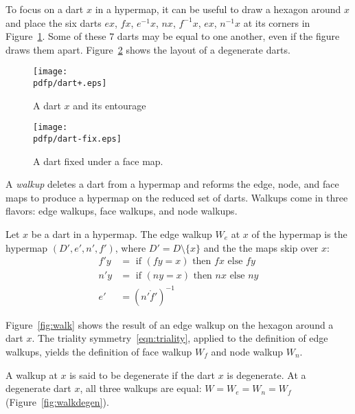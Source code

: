 To focus on a dart $x$ in a
hypermap, it can be useful to draw a hexagon around $x$ and place
the six darts $e x$,
$f x$, $e^{-1} x$, $n x$,  $f^{-1} x$, $e x$, $n^{-1} x$  at its corners
in Figure~\ref{fig:dart+}.  Some of these $7$ darts may be
equal to one another, even if the figure draws them apart.
Figure~\ref{fig:dart-fix} shows the layout of a degenerate darts.

\begin{figure}[htb]
  \centering
  \texttt{[image: \\pdfp/dart+.eps]}
  \caption{A dart $x$ and its entourage}
  \label{fig:dart+}
\end{figure}

\begin{figure}[htb]
  \centering
  \texttt{[image: \\pdfp/dart-fix.eps]}
  \caption{A dart fixed under a face map.}
  \label{fig:dart-fix}
\end{figure}


A {\it walkup} deletes
a dart from a hypermap and reforms the edge, node, and face
maps to produce a hypermap on the reduced set of darts.  Walkups
come in three flavors: edge walkups, face walkups,
and node walkups.

\begin{definition}[walkup]
Let $x$ be a dart in a hypermap.  The edge walkup 
$W_e$ at $x$ of the hypermap is the hypermap
$(D',e',n',f')$, where $D' = D\setminus\{x\}$ and the
the maps skip over $x$:
    $$
    \begin{array}{lll}
    f' y &= \text{ if } (f y =  x) \text{ then } f x \text{ else
    } f y\\
    n' y &= \text{ if } (n y = x) \text{ then } n x \text{ else
    } n y\\
    e' &= (n'\ocirc f')^{-1}
    \end{array}
    $$
\end{definition}

Figure~\ref{fig:walk} shows
the result of an edge walkup on the hexagon around a dart $x$.
The triality symmetry~\ref{eqn:triality}, applied to the definition
of edge walkups, yields the definition of
face walkup $W_f$ and node walkup $W_n$.  

A walkup at $x$ is said to be degenerate if the dart $x$ is degenerate.   At a degenerate dart $x$, all three walkups are equal: $W=W_e=W_n=W_f$ (Figure~\ref{fig:walkdegen}).

